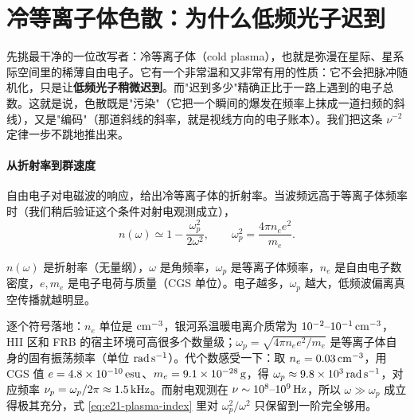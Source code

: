 \section{冷等离子体色散：为什么低频光子迟到}
\label{sec:e21-dispersion}

先挑最干净的一位改写者：冷等离子体（cold plasma），也就是弥漫在星际、星系际空间里的稀薄自由电子。它有一个非常温和又非常有用的性质：它不会把脉冲随机化，只是让\textbf{低频光子稍微迟到}。而"迟到多少"精确正比于一路上遇到的电子总数。这就是说，色散既是"污染"（它把一个瞬间的爆发在频率上抹成一道扫频的斜线），又是"编码"（那道斜线的斜率，就是视线方向的电子账本）。我们把这条 \(\nu^{-2}\) 定律一步不跳地推出来。

\paragraph{从折射率到群速度}
\label{sec:e21-groupvel}

自由电子对电磁波的响应，给出冷等离子体的折射率。当波频远高于等离子体频率时（我们稍后验证这个条件对射电观测成立），
\begin{equation}
  n(\omega)\simeq 1-\frac{\omega_p^2}{2\omega^2},
  \qquad
  \omega_p^2=\frac{4\pi n_e e^2}{m_e}.
  \label{eq:e21-plasma-index}
\end{equation}
\begin{formulaexplain}
\(n(\omega)\) 是折射率（无量纲），\(\omega\) 是角频率，\(\omega_p\) 是等离子体频率，\(n_e\) 是自由电子数密度，\(e,m_e\) 是电子电荷与质量（CGS 单位）。电子越多，\(\omega_p\) 越大，低频波偏离真空传播就越明显。
\end{formulaexplain}
逐个符号落地：\(n_e\) 单位是 \({\rm cm^{-3}}\)，银河系温暖电离介质常为 \(10^{-2}\text{--}10^{-1}\,{\rm cm^{-3}}\)，HII 区和 FRB 的宿主环境可高很多个数量级；\(\omega_p=\sqrt{4\pi n_e e^2/m_e}\) 是等离子体自身的固有振荡频率（单位 \({\rm rad\,s^{-1}}\)）。代个数感受一下：取 \(n_e=0.03\,{\rm cm^{-3}}\)，用 CGS 值 \(e=4.8\times10^{-10}\,{\rm esu}\)、\(m_e=9.1\times10^{-28}\,{\rm g}\)，得 \(\omega_p\approx 9.8\times10^{3}\,{\rm rad\,s^{-1}}\)，对应频率 \(\nu_p=\omega_p/2\pi\approx1.5\,{\rm kHz}\)。而射电观测在 \(\nu\sim10^{8}\text{--}10^{9}\,{\rm Hz}\)，所以 \(\omega\gg\omega_p\) 成立得极其充分，式 \eqref{eq:e21-plasma-index} 里对 \(\omega_p^2/\omega^2\) 只保留到一阶完全够用。

